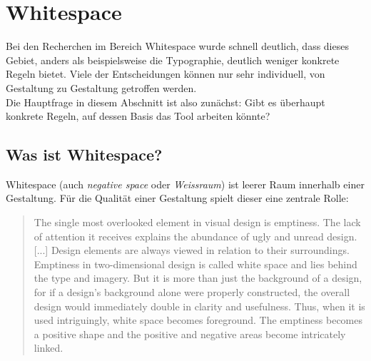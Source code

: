 
\chapter{Whitespace} %

\label{Whitespace} %



Bei den Recherchen im Bereich Whitespace wurde schnell deutlich, dass dieses Gebiet, anders als beispielsweise die Typographie, deutlich weniger konkrete Regeln bietet. Viele der Entscheidungen können nur sehr individuell, von Gestaltung zu Gestaltung getroffen werden. \\
Die Hauptfrage in diesem Abschnitt ist also zunächst: Gibt es überhaupt konkrete Regeln, auf dessen Basis das Tool arbeiten könnte?


\section{Was ist Whitespace?}

Whitespace (auch \textit{negative space} oder \textit{Weissraum}) ist leerer Raum innerhalb einer Gestaltung. Für die Qualität einer Gestaltung spielt dieser eine zentrale Rolle:

\begin{quote}
The single most overlooked element in visual design is emptiness. The lack of attention it receives explains the abundance of ugly and unread design. [...]
Design elements are always viewed in relation to their surroundings. Emptiness in two-dimensional design is called white space and lies behind the type and imagery. But it is more than just the background of a design, for if a design's background alone were properly constructed, the overall design would immediately double in clarity and usefulness. Thus, when it is used intriguingly, white space becomes foreground. The emptiness becomes a positive shape and the positive and negative areas become intricately linked. \cite[S.19]{white2011elements}
\end{quote}

